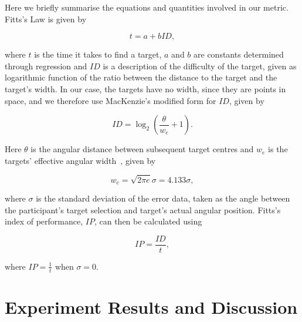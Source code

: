 \documentclass[sigconf, review=true, screen=true, anonymous=true]{acmart}
\begin{document}
Here we briefly summarise the equations and quantities involved in our metric.
Fitts's Law is given by  

\begin{equation}
  \label{eq:fitts-base}
  t = a + bID,
\end{equation}

\noindent
where $t$ is the time it takes to find a target, $a$ and $b$ are constants determined through regression and $ID$ is a description of the difficulty of the target, given as logarithmic function of the ratio between the distance to the target and the target's width.
In our case, the targets have no width, since they are points in space, and we therefore use MacKenzie's modified form for $ID$, given by

\begin{equation}
  \label{eq:fitts-id}
  ID = \log_2\left(\frac{\theta}{w_e} + 1\right).
\end{equation}

\noindent
Here $\theta$ is the angular distance between subsequent target centres and $w_e$ is the targets' effective angular width~\cite{welford1968fundamentals}, given by

\begin{equation}
  \label{eq:fitts-we}
  w_e = \sqrt{2\pi e}\sigma = 4.133\sigma,
\end{equation}

\noindent
where $\sigma$ is the standard deviation of the error data, taken as the angle between the participant's target selection and target's actual angular position.
Fitts's index of performance, $IP$, can then be calculated using 

\begin{equation}
  \label{eq:fitts-performance}
  IP = \frac{ID}{t},
\end{equation}

\noindent
where $IP = \frac{1}{t}$ when $\sigma=0$.

\section{Experiment Results and Discussion}
\label{sec:results}


\end{document}
